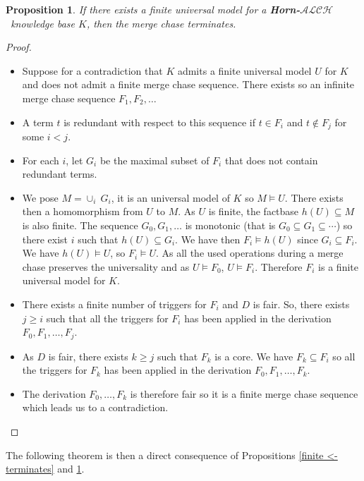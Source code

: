 \documentclass{article}
\newtheorem{proposition}{Proposition}[section]
\theoremstyle{definition}
\theoremstyle{remark}
\newcommand{\ALCH}{\textbf{Horn-$\mathcal{ALCH}$}}
\begin{document}
\begin{proposition} \label{finite -> terminates}
If there exists a finite universal model for a \ALCH\ knowledge base $K$, then the merge chase terminates.
\end{proposition}

\begin{proof}
\begin{itemize}
\item Suppose for a contradiction that $K$ admits a finite universal model $U$ for $K$ and does not admit a finite merge chase sequence. There exists so an infinite merge chase sequence $F_1, F_2, \ldots$
\item A term $t$ is redundant with respect to this sequence if $t \in F_i$ and $t \notin F_j$ for some $i < j$.
\item For each $i$, let $G_i$ be the maximal subset of $F_i$ that does not contain redundant terms.

\item We pose $M = \cup_i~G_i$, it is an universal model of $K$ so $M \models U$. There exists then a homomorphism from $U$ to $M$. As $U$ is finite, the factbase $h(U)\subseteq M$ is also finite. The sequence $G_0,G_1,\ldots$ is monotonic (that is $G_0 \subseteq G_1 \subseteq \cdots$) so there exist $i$ such that $h(U) \subseteq G_i$. We have then $F_i \models h(U)$ since $G_i \subseteq F_i$. We have $h(U) \models U$, so $F_i\models U$. As all the used operations during a merge chase preserves the universality and as $U \models F_0$, $U \models F_i$. Therefore $F_i$ is a finite universal model for $K$.

\item There exists a finite number of triggers for $F_i$ and $D$ is fair. So, there exists $j \geq i$ such that all the triggers for $F_i$ has been applied in the derivation $F_0,F_1,\ldots,F_j$.

\item As $D$ is fair, there exists $k \geq j$ such that $F_k$ is a core. We have $F_k \subseteq F_i$ so all the triggers for $F_k$ has been applied in the derivation $F_0,F_1,\ldots,F_k$.
\item The derivation $F_0,\ldots,F_k$ is therefore fair so it is a finite merge chase sequence which leads us to a contradiction.
\end{itemize}
\end{proof}

The following theorem is then a direct consequence of Propositions \ref{finite <- terminates} and \ref{finite -> terminates}.
\end{document}
